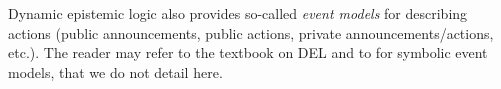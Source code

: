 Dynamic epistemic logic also provides so-called \emph{event models} for describing actions (public announcements, public actions, private announcements/actions, etc.). The reader may refer to the textbook on DEL \cite{DitmarschvdHoekKooi} and to \cite{DBLP:conf/atal/CharrierS17} for symbolic event models, that we do not detail here.